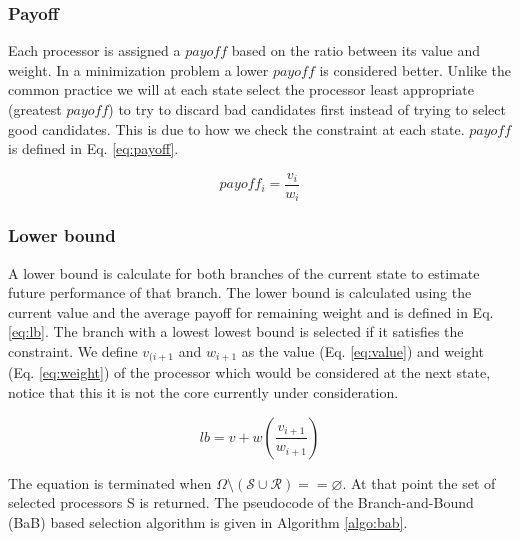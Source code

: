 \documentclass[conference]{IEEEtran}
\begin{document}
\subsubsection{Payoff}
Each processor is assigned a $payoff$ based on the ratio between its value and weight. In a minimization problem a lower $payoff$ is considered better. Unlike the common practice we will at each state select the processor least appropriate (greatest $payoff$) to try to discard bad candidates first instead of trying to select good candidates. This is due to how we check the constraint at each state. $payoff$ is defined in Eq. \ref{eq:payoff}.

\begin{equation} \label{eq:payoff}
	payoff_{i} = \frac{v_{i}}{w_{i}}
\end{equation}

\subsubsection{Lower bound}
A lower bound is calculate for both branches of the current state to estimate future performance of that branch. The lower bound is calculated using the current value and the average payoff for remaining weight and is defined in Eq. \ref{eq:lb}. The branch with a lowest lowest bound is selected if it satisfies the constraint. We define $v_{(i+1}$ and $w_{i+1}$ as the value (Eq. \ref{eq:value}) and weight (Eq. \ref{eq:weight}) of the processor which would be considered at the next state, notice that this it is not the core currently under consideration.

\begin{equation} \label{eq:lb}
	lb = v + w(\frac{v_{i+1}}{w_{i+1}})
\end{equation}

The equation is terminated when $\Omega \setminus (\mathcal{S} \cup \mathcal{R}) == \varnothing$. At that point the set of selected processors {\cal S} is returned. The pseudocode of the Branch-and-Bound (BaB) based selection algorithm is given in Algorithm \ref{algo:bab}.
\end{document}

